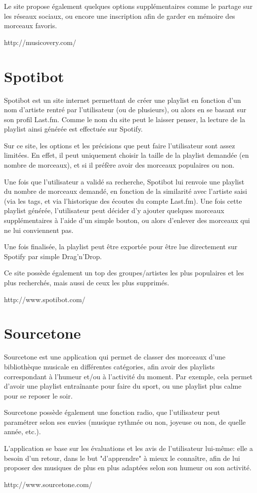 Le site propose également quelques options supplémentaires comme le partage 
sur les réseaux sociaux, ou encore une inscription afin de garder en mémoire 
des morceaux favoris.

http://musicovery.com/

\section{Spotibot}
\label{existant:spotibot}

Spotibot est un site internet permettant de créer une playlist en fonction 
d'un nom d'artiste rentré par l'utilisateur (ou de plusieurs), ou alors en 
se basant sur son profil Last.fm. Comme le nom du site peut le laisser 
penser, la lecture de la playlist ainsi générée est effectuée sur Spotify.

Sur ce site, les options et les précisions que peut faire l'utilisateur sont 
assez limitées. En effet, il peut uniquement choisir la taille de la 
playlist demandée (en nombre de morceaux), et si il préfère avoir des 
morceaux populaires ou non.

Une fois que l'utilisateur a validé sa recherche, Spotibot lui renvoie une 
playlist du nombre de morceaux demandé, en fonction de la similarité avec 
l'artiste saisi (via les tags, et via l'historique des écoutes du compte 
Last.fm). Une fois cette playlist générée, l'utilisateur peut décider d'y 
ajouter quelques morceaux supplémentaires à l'aide d'un simple bouton, ou 
alors d'enlever des morceaux qui ne lui conviennent pas.

Une fois finalisée, la playlist peut être exportée pour être lue directement 
sur Spotify par simple Drag'n'Drop.

Ce site possède également un top des groupes/artistes les plus populaires et 
les plus recherchés, mais aussi de ceux les plus supprimés.

http://www.spotibot.com/

\section{Sourcetone}
\label{existant:sourcetone}

Sourcetone est une application qui permet de classer des morceaux d'une 
bibliothèque musicale en différentes catégories, afin avoir des playlists 
correspondant à l'humeur et/ou à l'activité du moment. Par exemple, cela 
permet d'avoir une playlist entraînante pour faire du sport, ou une playlist 
plus calme pour se reposer le soir.

Sourcetone possède également une fonction radio, que l'utilisateur peut 
paramétrer selon ses envies (musique rythmée ou non, joyeuse ou non, de 
quelle année, etc.).

L'application se base sur les évaluations et les avis de l'utilisateur 
lui-même: elle a besoin d'un retour, dans le but "d'apprendre" à mieux le 
connaître, afin de lui proposer des musiques de plus en plus adaptées selon 
son humeur ou son activité.

http://www.sourcetone.com/